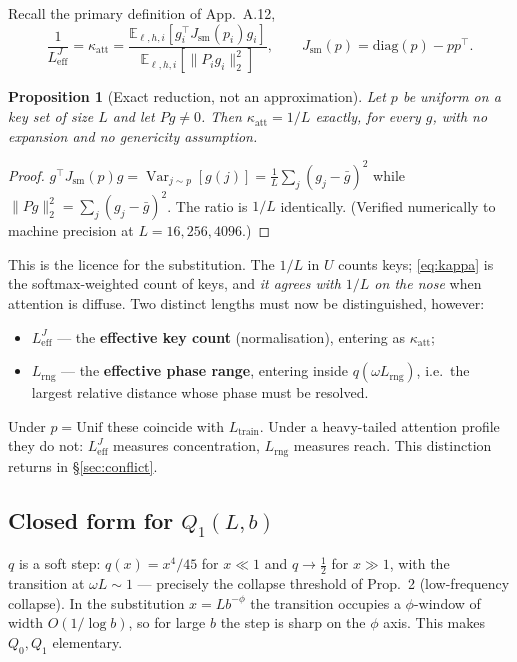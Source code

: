 \documentclass[11pt]{article}
\newtheorem{proposition}[theorem]{Proposition}
\theoremstyle{definition}
\newcommand{\Ltr}{L_{\mathrm{train}}}
\newcommand{\Leff}{L_{\mathrm{eff}}^{J}}
\newcommand{\E}{\mathbb{E}}
\DeclareMathOperator{\Var}{Var}
\begin{document}
Recall the primary definition of App.~A.12,
\begin{equation}
\frac{1}{\Leff}=\kappa_{\mathrm{att}}
=\frac{\E_{\ell,h,i}\!\left[g_i^\top J_{\mathrm{sm}}(p_i)g_i\right]}
       {\E_{\ell,h,i}\!\left[\|P_i g_i\|_2^2\right]},
\qquad J_{\mathrm{sm}}(p)=\mathrm{diag}(p)-pp^\top .
\label{eq:kappa}
\end{equation}

\begin{proposition}[Exact reduction, not an approximation]\label{prop:exact-uniform}
Let $p$ be uniform on a key set of size $L$ and let $Pg\ne0$. Then $\kappa_{\mathrm{att}}=1/L$
\emph{exactly}, for every $g$, with no expansion and no genericity assumption.
\end{proposition}

\begin{proof}
$g^\top J_{\mathrm{sm}}(p)g=\Var_{j\sim p}[g(j)]=\tfrac1L\sum_j(g_j-\bar g)^2$ while
$\|Pg\|_2^2=\sum_j(g_j-\bar g)^2$. The ratio is $1/L$ identically. (Verified numerically to machine
precision at $L=16,256,4096$.)
\end{proof}

This is the licence for the substitution. The $1/L$ in $U$ counts keys; \eqref{eq:kappa} is the
softmax-weighted count of keys, and \emph{it agrees with $1/L$ on the nose} when attention is
diffuse. Two distinct lengths must now be distinguished, however:
\begin{itemize}
\item $\Leff$ --- the \textbf{effective key count} (normalisation), entering as $\kappa_{\mathrm{att}}$;
\item $L_{\mathrm{rng}}$ --- the \textbf{effective phase range}, entering inside $q(\omega L_{\mathrm{rng}})$,
i.e.\ the largest relative distance whose phase must be resolved.
\end{itemize}
Under $p=\mathrm{Unif}$ these coincide with $\Ltr$. Under a heavy-tailed attention profile they do
not: $\Leff$ measures concentration, $L_{\mathrm{rng}}$ measures reach. This distinction returns in
\S\ref{sec:conflict}.

\subsection{Closed form for \texorpdfstring{$Q_1(L,b)$}{Q1}}

$q$ is a soft step: $q(x)=x^4/45$ for $x\ll1$ and $q\to\tfrac12$ for $x\gg1$, with the transition
at $\omega L\sim1$ --- precisely the collapse threshold of Prop.~2 (low-frequency collapse). In the
substitution $x=Lb^{-\phi}$ the transition occupies a $\phi$-window of width $O(1/\log b)$, so for
large $b$ the step is sharp on the $\phi$ axis. This makes $Q_0,Q_1$ elementary.
\end{document}
